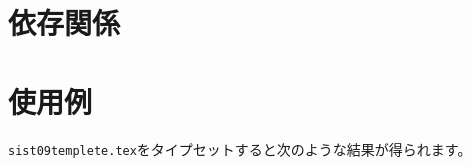 ﻿\documentclass[uplatex]{jsarticle}
\renewcommand{\sistTitle}{sist09}%
\renewcommand{\Engtitle}{sist09}%
\renewcommand{\reportnumber}{}%
\renewcommand{\thesis}{パッケージ説明文書}%
\renewcommand{\edition}{(v1.0.0)}%
\renewcommand{\id}{}%
\renewcommand{\sistAuthor}{渡邉　充哉}%
\renewcommand{\Engauthor}{WATANABE Atsuya}%
\renewcommand{\freespace}{}
\renewcommand{\yearr}{2021}%
\renewcommand{\sistDate}{\today}%
\renewcommand{\organization}{~}
\renewcommand{\department}{~}%
\renewcommand{\Engdepartment}{}%
\renewcommand{\address}{}%
\renewcommand{\tel}{}%
\renewcommand{\mail}{}
\renewcommand{\editdata}{\sistDate}%
\begin{document}
\section{依存関係}

\section{使用例}
\verb|sist09templete.tex|をタイプセットすると次のような結果が得られます。
\clearpage

\clearpage

\renewcommand{\sistTitle}{\tt\textbackslash sistTitle}%
\renewcommand{\Engtitle}{\tt\textbackslash Engtitle}%
\renewcommand{\reportnumber}{\tt\textbackslash reportnumber}%
\renewcommand{\thesis}{\tt\textbackslash thesis}%
\renewcommand{\edition}{\tt\textbackslash edition}%
\renewcommand{\id}{\tt\textbackslash id}%
\renewcommand{\sistAuthor}{\tt \textbackslash sistAuthor}%
\renewcommand{\Engauthor}{\tt\textbackslash Engauthor}%
\renewcommand{\freespace}{\tt\textbackslash freespace}
\renewcommand{\yearr}{\tt\textbackslash yearr}%
\renewcommand{\sistDate}{\tt\textbackslash sistDate}%
\renewcommand{\organization}{\tt\textbackslash organization}
\renewcommand{\department}{\tt\textbackslash department}%
\renewcommand{\Engdepartment}{\tt\textbackslash Engdepartment}%
\renewcommand{\address}{\tt\textbackslash address}%
\renewcommand{\tel}{\tt\textbackslash tel}%
\renewcommand{\mail}{\tt\textbackslash mail}
\renewcommand{\editdata}{\tt\textbackslash editdata}%
\renewcommand{\syoroku}{\tt\textbackslash syoroku}
\renewcommand{\datee}{\tt\textbackslash datee}
\renewcommand{\Engaddress}{\tt\textbackslash Engaddress}
\renewcommand{\ISBN}{\tt\textbackslash ISBN}
\renewcommand{\ISSN}{\tt\textbackslash ISSN}
\renewcommand{\keyword}{\tt\textbackslash keyword}
\renewcommand{\thesaurus}{\tt\textbackslash thesaurus}
\renewcommand{\category}{\tt\textbackslash category}
\renewcommand{\valuee}{\tt\textbackslash valuee}
\maketitlepage
\makedocumentseet
\end{document}
